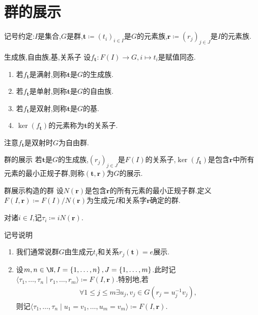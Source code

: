 \section{群的展示}

记号约定:$I$是集合,$G$是群,$\mathbf{t}\coloneq\left(t_{i}\right)_{i\in I}$是$G$的元素族,$\mathbf{r}\coloneq\left(r_{j}\right)_{j\in J}$是$I$的元素族.

\begin{definition}{生成族,自由族,基,关系子}{}
	设$f_{\mathbf{t}}:F\left(I\right)\to G,i\mapsto t_{i}$是赋值同态.
	\begin{enumerate}
		\item 若$f_{\mathbf{t}}$是满射,则称$\mathbf{t}$是$G$的生成族.
		\item 若$f_{\mathbf{t}}$是单射,则称$\mathbf{t}$是$G$的自由族.
		\item 若$f_{\mathbf{t}}$是双射,则称$\mathbf{t}$是$G$的基.
		\item $\ker\left(f_{\mathbf{t}}\right)$的元素称为$\mathbf{t}$的关系子.
	\end{enumerate}
\end{definition}

注意$f_{\mathbf{t}}$是双射时$G$为自由群.

\begin{definition}{群的展示}{}
	若$\mathbf{t}$是$G$的生成族,$\left(r_{j}\right)_{j\in J}$是$F\left(I\right)$的关系子,$\ker\left(f_{\mathbf{t}}\right)$是包含$\mathbf{r}$中所有元素的最小正规子群,则称$\left(\mathbf{t},\mathbf{r}\right)$为$G$的展示.
\end{definition}

\begin{definition}{群展示构造的群}{}
	设$N\left(\mathbf{r}\right)$是包含$\mathbf{r}$的所有元素的最小正规子群.定义$F\left(I,\mathbf{r}\right)\coloneq F\left(I\right)/N\left(\mathbf{r}\right)$为生成元$I$和关系字$\mathbf{r}$确定的群.
	
	对诸$i\in I$,记$\tau_{i}\coloneq iN\left(\mathbf{r}\right)$.
\end{definition}

\begin{remark}{记号说明}{}
	\begin{enumerate}
		\item 我们通常说群$G$由生成元$t_{i}$和关系$r_{j}\left(\mathbf{t}\right)=e$展示.
		\item 设$m,n\in\N,I=\left\{1,\ldots,n\right\},J=\left\{1,\ldots,m\right\}$.此时记$\langle\tau_{1},\ldots,\tau_{n}\mid r_{1},\ldots,r_{m}\rangle\coloneq F\left(I,\mathbf{r}\right)$.特别地,若
		\begin{align*}
			\forall 1\leq j\leq m\exists u_{j},v_{j}\in G\left(r_{j}=u_{j}^{-1}v_{j}\right),
		\end{align*}
		则记$\langle\tau_{1},\ldots,\tau_{n}\mid u_{1}=v_{1},\ldots,u_{m}=v_{m}\rangle\coloneq F\left(I,\mathbf{r}\right)$.
	\end{enumerate}
\end{remark}

